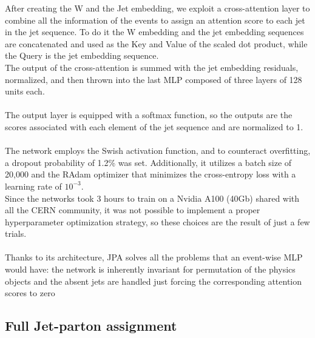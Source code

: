 After creating the W and the Jet embedding, we exploit a cross-attention layer to combine all the information of the events to assign an attention score to each jet in the jet sequence. To do it the W embedding and the jet embedding sequences are concatenated and used as the Key and Value of the scaled dot product, while the Query is the jet embedding sequence.\\
The output of the cross-attention is summed with the jet embedding residuals, normalized, and then thrown into the last MLP composed of three layers of 128 units each.\\
\\
The output layer is equipped with a softmax function, so the outputs are the scores associated with each element of the jet sequence and are normalized to 1.\\
\\
The network employs the Swish activation function, and to counteract overfitting, a dropout probability of 1.2\% was set. Additionally, it utilizes a batch size of 20,000 and the RAdam optimizer that minimizes the cross-entropy loss with a learning rate of $10^{-3}$.\\
Since the networks took 3 hours to train on a Nvidia A100 (40Gb) shared with all the CERN community, it was not possible to implement a proper hyperparameter optimization strategy, so these choices are the result of just a few trials. \\
\\
Thanks to its architecture, JPA solves all the problems that an event-wise MLP would have: the network is inherently invariant for permutation of the physics objects and the absent jets are handled just forcing the corresponding attention scores to zero






\subsection{Full Jet-parton assignment}

